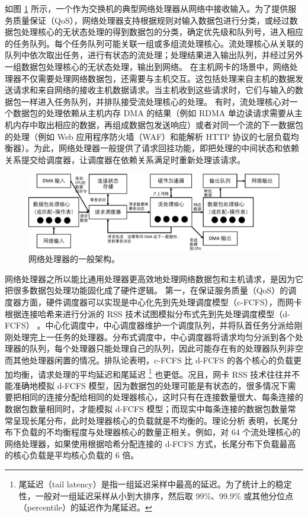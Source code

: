 如图 \ref{background:fig:network_processor} 所示，一个作为交换机的典型网络处理器从网络中接收输入。为了提供服务质量保证（QoS），网络处理器支持根据规则对输入数据包进行分类，或经过数据包处理核心的无状态处理的得到数据包的分类，确定优先级和队列号，进入相应的任务队列。每个任务队列可能关联一组或多组流处理核心。流处理核心从关联的队列中依次取出任务，进行有状态的流处理；处理结果进入输出队列，并经过另外一组数据包处理核心的无状态处理，输出到网络。
在主机网卡的场景中，网络处理器不仅需要处理网络数据包，还需要与主机交互。这包括处理来自主机的数据发送请求和来自网络的接收主机数据请求。当主机收到这些请求时，它们与输入的数据包一样进入任务队列，并排队接受流处理核心的处理。
有时，流处理核心对一个数据包的处理依赖从主机内存 DMA 的结果（例如 RDMA 单边读请求需要从主机内存中取出相应的数据，再组成数据包发送响应）或者对同一个流的下一数据包的处理（例如 Web 应用程序防火墙（WAF）和能解析 HTTP 协议的七层负载均衡器）。为此，网络处理器一般提供了请求回挂功能，即把处理的中间状态和依赖关系提交给调度器，让调度器在依赖关系满足时重新处理该请求。


\begin{figure}[htbp]
	\centering
	\includegraphics[width=1.0\textwidth]{figures/network_processor.pdf}
	\caption{网络处理器的一般架构。}
	\label{background:fig:network_processor}
\end{figure}


网络处理器之所以能比通用处理器更高效地处理网络数据包和主机请求，是因为它把很多数据包处理功能固化成了硬件逻辑。
第一，在保证服务质量（QoS）的调度器方面，硬件调度器可以实现是中心化先到先处理调度模型（c-FCFS），而网卡根据连接哈希来进行分派的 RSS 技术试图模拟分布式先到先处理调度模型（d-FCFS） \cite{kaffes2019shinjuku,ousterhout2019shenango}。中心化调度中，中心调度器维护一个调度队列，并将队首任务分派给刚刚处理完上一任务的处理器。分布式调度中，中心调度器将请求均匀分派到各个处理器的队列，每个处理器只能处理自己的队列，因此可能存在有的处理器队列非空而其他处理器闲置的情况。排队论表明，c-FCFS 比 d-FCFS 的各个核心的负载更加均衡，请求处理的平均延迟和尾延迟 \footnote{尾延迟（tail latency）是指一组延迟采样中最高的延迟。为了统计上的稳定性，一般对一组延迟采样从小到大排序，然后取 99\%、99.9\% 或其他分位点（percentile）的延迟作为尾延迟。} 也更低。况且，网卡 RSS 技术往往并不能准确地模拟 d-FCFS 模型，因为数据包的处理可能是有状态的，很多情况下需要把相同的连接分配给相同的处理器核心，这时只有在连接数量很大、每条连接的数据包数量相同时，才能模拟 d-FCFS 模型；而现实中每条连接的数据包数量常常呈现长尾分布，此时处理器核心的负载就是不均衡的。理论分析 \cite{li2017kv} 表明，长尾分布下负载的不均衡程度与处理器核心的数量正相关。例如，对 64 个流处理核心的网络处理器，如果使用根据哈希分配连接的 d-FCFS 方式，长尾分布下负载最高的核心负载是平均核心负载的 6 倍。

